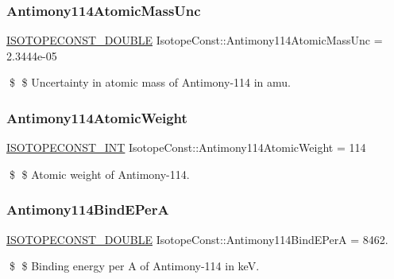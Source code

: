 \subsubsection{\texorpdfstring{Antimony114\+Atomic\+Mass\+Unc}{Antimony114AtomicMassUnc}}
{\footnotesize\ttfamily \mbox{\hyperlink{group___isotope_const-_macros_ga8f45a7272ce02c0b4c65c44636ed719a}{I\+S\+O\+T\+O\+P\+E\+C\+O\+N\+S\+T\+\_\+\+D\+O\+U\+B\+LE}} Isotope\+Const\+::\+Antimony114\+Atomic\+Mass\+Unc = 2.\+3444e-\/05}

\$ \$ Uncertainty in atomic mass of Antimony-\/114 in amu. \mbox{\label{group___isotope_const-_antimony-_sb114_ga6cca920fc3dafefc000ed310f5815b67}} 
\subsubsection{\texorpdfstring{Antimony114\+Atomic\+Weight}{Antimony114AtomicWeight}}
{\footnotesize\ttfamily \mbox{\hyperlink{group___isotope_const-_macros_ga5f18360b3e99483a35c32d789e62621c}{I\+S\+O\+T\+O\+P\+E\+C\+O\+N\+S\+T\+\_\+\+I\+NT}} Isotope\+Const\+::\+Antimony114\+Atomic\+Weight = 114}

\$ \$ Atomic weight of Antimony-\/114. \mbox{\label{group___isotope_const-_antimony-_sb114_ga0297f7f92f24cde47a6c84a5c5d82a6a}} 
\subsubsection{\texorpdfstring{Antimony114\+Bind\+E\+PerA}{Antimony114BindEPerA}}
{\footnotesize\ttfamily \mbox{\hyperlink{group___isotope_const-_macros_ga8f45a7272ce02c0b4c65c44636ed719a}{I\+S\+O\+T\+O\+P\+E\+C\+O\+N\+S\+T\+\_\+\+D\+O\+U\+B\+LE}} Isotope\+Const\+::\+Antimony114\+Bind\+E\+PerA = 8462.}

\$ \$ Binding energy per A of Antimony-\/114 in keV. \mbox{\label{group___isotope_const-_antimony-_sb114_ga6d10c8a8ea562839355ec2dd7914fd3a}} 

